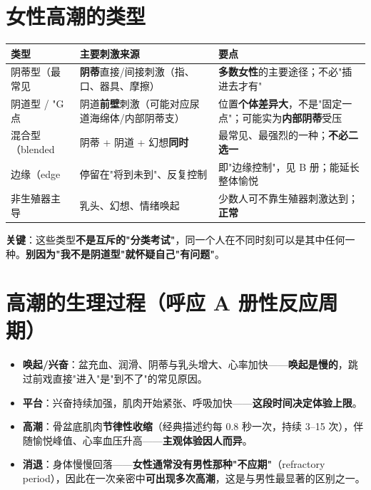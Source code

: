 \documentclass[12pt,UTF8,openany]{ctexbook}
\begin{document}
\section{女性高潮的类型}

\begin{tabularx}{\textwidth}{l X X}
\toprule
\textbf{类型} & \textbf{主要刺激来源} & \textbf{要点} \\
\midrule
阴蒂型（最常见 & \textbf{阴蒂}直接/间接刺激（指、口、器具、摩擦） & \textbf{多数女性}的主要途径；不必"插进去才有" \\
阴道型 / "G 点 & 阴道\textbf{前壁}刺激（可能对应尿道海绵体/内部阴蒂支） & 位置\textbf{个体差异大}，不是"固定一点"；可能实为\textbf{内部阴蒂}受压 \\
混合型（blended & 阴蒂 + 阴道 + 幻想\textbf{同时} & 最常见、最强烈的一种；\textbf{不必二选一} \\
边缘（edge & 停留在"将到未到"、反复控制 & 即"边缘控制"，见 B 册；能延长整体愉悦 \\
非生殖器主导 & 乳头、幻想、情绪唤起 & 少数人可不靠生殖器刺激达到；\textbf{正常} \\
\bottomrule
\end{tabularx}

\vspace{0.5em}
\noindent\textbf{关键}：这些类型\textbf{不是互斥的"分类考试"}，同一个人在不同时刻可以是其中任何一种。\textbf{别因为"我不是阴道型"就怀疑自己"有问题"}。

\section{高潮的生理过程（呼应 A 册性反应周期）}

\begin{itemize}[leftmargin=2em,itemsep=0.3em]
  \item \textbf{唤起/兴奋}：盆充血、润滑、阴蒂与乳头增大、心率加快——\textbf{唤起是慢的}，跳过前戏直接"进入"是"到不了"的常见原因。
  \item \textbf{平台}：兴奋持续加强，肌肉开始紧张、呼吸加快——\textbf{这段时间决定体验上限}。
  \item \textbf{高潮}：骨盆底肌肉\textbf{节律性收缩}（经典描述约每 0.8 秒一次，持续 3--15 次），伴随愉悦峰值、心率血压升高——\textbf{主观体验因人而异}。
  \item \textbf{消退}：身体慢慢回落——\textbf{女性通常没有男性那种"不应期"}（refractory period），因此在一次亲密中\textbf{可出现多次高潮}，这是与男性最显著的区别之一。
\end{itemize}
\end{document}
